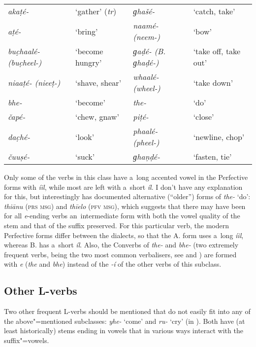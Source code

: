 \begin{table}[H]
\begin{tabularx}{\textwidth}{ Q Q Q Q }
\textit{akaṭé-} &
`gather' (\textit{tr}) &
\textit{ɡhašé-} &
`catch, take'\\
\textit{aṭé-} &
`bring' &
\textit{naamé- (neem-)} &
`bow'\\
\textit{buc̣haalé- (buc̣heel-)} &
`become hungry' &
\textit{ɡaḍé- (B. ɡhaḍé-)} &
`take off, take out'\\
\textit{niaaṭé- (nieeṭ-)} &
`shave, shear' &
\textit{whaalé- (wheel-)} &
`take down'\\
\textit{bhe-} &
`become' &
\textit{the-} &
`do'\\
\textit{čapé-} &
`chew, gnaw' &
\textit{piṭé-} &
`close'\\
\textit{dac̣hé-} &
`look' &
\textit{phaalé- (pheel-)} &
`newline, chop'\\
\textit{čuuṣé-} &
`suck' &
\textit{ɡhaṇḍé-} &
`fasten, tie' \\
\end{tabularx}
\end{table}


Only some of the verbs in this class have a~long accented vowel in the Perfective forms with
\textit{íil}, while most are left with a~short \textit{íl}. I don't have any explanation for
this, but interestingly \citet[22--23]{morgenstierne1941} has documented alternative (``older'')
forms of \textit{the-} `do': \textit{thiānu} (\textsc{prs msg}) and \textit{thīelo}
(\textsc{pfv msg}), which suggests that there may have been for all \textit{e}-ending verbs
an~intermediate form with both the vowel quality of the stem and that of the suffix preserved. For
this particular verb, the modern Perfective forms differ between the dialects, so that the A. form
uses a~long \textit{íil}, whereas B. has a~short \textit{íl}. Also, the Converbs of
\textit{the-} and \textit{bhe-} (two extremely frequent verbs, being the two most common
verbalisers, see  and ) are formed with \textit{e}
(\textit{the} and \textit{bhe}) instead of the \textit{-í} of the other verbs of this subclass.


\subsection{Other L-verbs}
\label{subsec:8-3-4}


Two other frequent L-verbs should be mentioned that do not easily fit into any of the above"=mentioned subclasses: \textit{yhe-} `come' and \textit{ru-} `cry' (in ). Both have (at least historically) stems ending in vowels that in various ways interact with the suffix"=vowels. 


